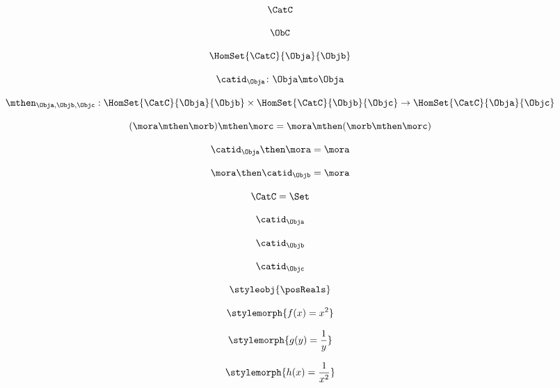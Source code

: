 {\begin{forslides}
 \begin{equation}\label{eq:15}
 \CatC
 \end{equation}
 
  \begin{equation}\label{eq:16}
 \ObC
 \end{equation}
 
  \begin{equation}\label{eq:17}
\HomSet{\CatC}{\Obja}{\Objb}
 \end{equation}
 
 \begin{equation}\label{eq:18}
\catid_{\Obja}\colon \Obja \mto \Obja
 \end{equation}
 
  \begin{equation}\label{eq:19}
        \mthen_{\Obja,\Objb,\Objc}: \HomSet{\CatC}{\Obja}{\Objb} \times \HomSet{\CatC}{\Objb}{\Objc}\to \HomSet{\CatC}{\Obja}{\Objc}
 \end{equation}

 \begin{equation}\label{eq:20}
(\mora\mthen \morb)
      \mthen \morc= \mora \mthen (\morb \mthen \morc)
 \end{equation}
 
  \begin{equation}\label{eq:21}
 \catid_{\Obja} \then \mora = \mora 
 \end{equation}
 
  \begin{equation}\label{eq:22}
\mora \then \catid_{\Objb} = \mora
 \end{equation}
 
 \begin{equation}\label{eq:23}
\CatC = \Set
 \end{equation}

 
 \begin{equation}\label{eq:24}
 \catid_{\Obja}
 \end{equation}
 
  \begin{equation}\label{eq:25}
 \catid_{\Objb}
 \end{equation}
 
 \begin{equation}\label{eq:26}
 \catid_{\Objc}
 \end{equation}
 
  \begin{equation}\label{eq:27}
 \styleobj{\posReals}
 \end{equation}
 
 \begin{equation}\label{eq:28}
 \stylemorph{f(x) = x^2}
 \end{equation}
 
 \begin{equation}\label{eq:29}
 \stylemorph{g(y) = \frac{1}{y}}
 \end{equation}
 
 \begin{equation}\label{eq:30}
 \stylemorph{h(x) = \frac{1}{x^2}}
 \end{equation}

  \end{forslides}}